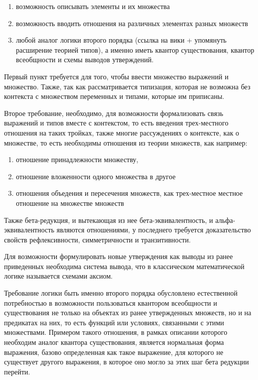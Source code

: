 \documentclass[times,specification,annotation]{itmo-student-thesis}
\begin{document}
\begin{enumerate}
    \item возможность описывать элементы и их множества
    \item возможность вводить отношения на различных элементах разных множеств
    \item любой аналог логики второго порядка (\todo ссылка на вики + \todo упомянуть расширение теорией типов), а именно иметь квантор существования, квантор всеобщности и схемы выводов утверждений.
\end{enumerate}

Первый пункт требуется для того, чтобы ввести множество выражений и множество. Также, так как рассматривается типизация, которая не возможна без контекста с множеством переменных и типами, которые им приписаны. 

Второе требование, необходимо, для возможности формализовать связь выражений и типов вместе с контекстом, то есть введения трех-местного отношения на таких тройках, также многие рассуждениях о контексте, как о множестве, то есть необходимы отношения из теории множеств, как например:
\begin{enumerate}
    \item отношение принадлежности множеству, 
    \item отношение вложенности одного множества в другое
    \item отношения объедения и пересечения множеств, как трех-местное местное отношение на множестве множеств
\end{enumerate}

Также бета-редукция, и вытекающая из нее бета-эквивалентность, и альфа-эквивалентность являются отношениями, у последнего требуется доказательство свойств рефлексивности, симметричности и транзитивности.

Для возможности формулировать новые утверждения как выводы из ранее приведенных необходима система вывода, что в классическом математической логике называется схемами аксиом.

Требование логики быть именно второго порядка обусловлено естественной потребностью в возможности пользоваться квантором всеобщности и существования не только на объектах из ранее утвержденных множеств, но и на предикатах на них, то есть функций или условиях, связанными с этими множествами. Примером такого отношения, в рамках описании которого необходим аналог квантора существования, является нормальная форма выражения, базово определенная как такое выражение, для которого не существует другого выражения, в которое оно могло за этих шаг бета редукции перейти. 
\end{document}
